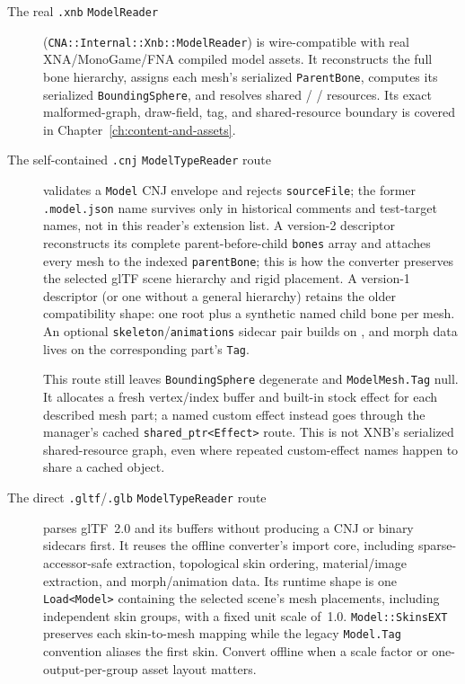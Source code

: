 \begin{description}
  \item[The real \texttt{.xnb} \texttt{ModelReader}]
        (\texttt{CNA::Internal::Xnb::ModelReader}) is wire-compatible with real
        XNA/MonoGame/FNA compiled model assets. It reconstructs the full bone hierarchy, assigns
        each mesh's serialized \texttt{ParentBone}, computes its serialized
        \texttt{BoundingSphere}, and resolves shared /%
        / resources. Its exact malformed-graph, draw-field,
        tag, and shared-resource boundary is covered in Chapter~\ref{ch:content-and-assets}.
  \item[The self-contained \texttt{.cnj} \texttt{ModelTypeReader} route]
        validates a \texttt{Model} CNJ envelope and rejects \texttt{sourceFile}; the former
        \texttt{.model.json} name survives only in historical comments and test-target names,
        not in this reader's extension list. A version-2 descriptor reconstructs its complete
        parent-before-child \texttt{bones} array and attaches every mesh to the indexed
        \texttt{parentBone}; this is how the converter preserves the selected glTF scene
        hierarchy and rigid placement. A version-1 descriptor (or one without a general
        hierarchy) retains the older compatibility shape: one root plus a synthetic named child
        bone per mesh. An optional \texttt{skeleton}/\texttt{animations} sidecar pair builds
         on , and morph data lives on the corresponding
        part's \texttt{Tag}.

        This route still leaves \texttt{BoundingSphere} degenerate and
        \texttt{ModelMesh.Tag} null. It allocates a fresh vertex/index buffer and built-in stock
        effect for each described mesh part; a named custom effect instead goes through the
        manager's cached \texttt{shared\_ptr<Effect>} route. This is not XNB's serialized
        shared-resource graph, even where repeated custom-effect names happen to share a cached
        object.
  \item[The direct \texttt{.gltf}/\texttt{.glb} \texttt{ModelTypeReader} route]
        parses glTF~2.0 and its buffers without producing a CNJ or binary sidecars first. It
        reuses the offline converter's import core, including sparse-accessor-safe extraction,
        topological skin ordering, material/image extraction, and morph/animation data. Its
        runtime shape is one \texttt{Load<Model>} containing the selected scene's mesh
        placements, including independent skin groups, with a fixed unit scale of~1.0.
        \texttt{Model::SkinsEXT} preserves each skin-to-mesh mapping while the legacy
        \texttt{Model.Tag} convention aliases the first skin. Convert offline when a scale factor
        or one-output-per-group asset layout matters.


\end{description}
